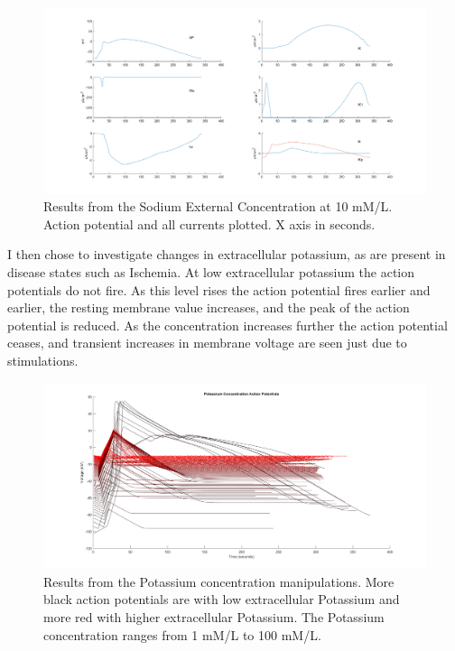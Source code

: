\documentclass[12pt]{article}
\begin{document}
\begin{figure}[H]
	
	\centering	
	\includegraphics[width = 1\textwidth]{NaCase.png}
	\caption{ Results from the Sodium External Concentration at 10 mM/L. Action potential and all currents plotted. X axis in seconds. }
	\label{fig:NaCase}
\end{figure}

\par{}
I then chose to investigate changes in extracellular potassium, as are present in disease states such as Ischemia. At low extracellular potassium the action potentials do not fire. As this level rises the action potential fires earlier and earlier, the resting membrane value increases, and the peak of the action potential is reduced. As the concentration increases further the action potential ceases, and transient increases in membrane voltage are seen just due to stimulations.

\begin{figure}[H]
	
	\centering	
	\includegraphics[width = 1\textwidth]{KAPs.png}
	\caption{ Results from the Potassium concentration manipulations. More black action potentials are with low extracellular Potassium and more red with higher extracellular Potassium. The Potassium concentration ranges from 1 mM/L to 100 mM/L. }
	\label{fig:AllKAP}
\end{figure}
\end{document}
